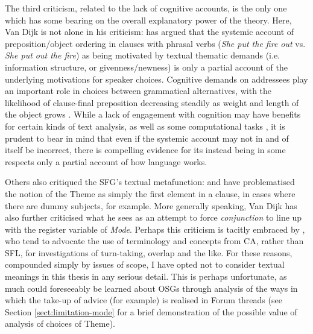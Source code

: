The third criticism, related to the lack of cognitive accounts, is the only one which has some bearing on the overall explanatory power of the theory. Here, Van Dijk is not alone in his criticism: \textcite{rohdenburg_cognitive_1996} has argued that the systemic account of preposition\slash object ordering in clauses with phrasal verbs (\emph{She put the fire out} vs. \emph{She put out the fire}) as being motivated by textual thematic demands (i.e. information structure, or givenness\slash newness) is only a partial account of the underlying motivations for speaker choices. Cognitive demands on addressees play an important role in choices between grammatical alternatives, with the likelihood of clause\hyp{}final preposition decreasing steadily as weight and length of the object grows \cite[c.f.][]{hawkins1992syntactic}. While a lack of engagement with cognition may have benefits for certain kinds of text analysis, as well as some computational tasks \cite{odonnell_[sys-func]_2014}, it is prudent to bear in mind that even if the systemic account may not in and of itself be incorrect, there is compelling evidence for its instead being in some respects only a partial account of how language works.

Others also critiqued the \gls{SFG}'s textual metafunction: \textcite{huddleston_constituency_1988} and \textcite{widdowson_text_2008} have problematised the notion of the \gls{Theme} as simply the first element in a clause, in cases where there are dummy subjects, for example. More generally speaking, Van Dijk has also further criticised what he sees as an attempt to force  \emph{conjunction} to line up with the register variable of \emph{Mode}. Perhaps this criticism is tacitly embraced by \textcite{eggins_analysing_2004}, who tend to advocate the use of terminology and concepts from \gls{CA}, rather than \gls{SFL}, for investigations of turn\hyp{}taking, overlap and the like. For these reasons, compounded simply by issues of scope, I have opted not to consider textual meanings in this thesis in any serious detail. This is perhaps unfortunate, as much could foreseeably be learned about \glspl{OSG} through analysis of the ways in which the take\hyp{}up of advice (for example) is realised in \gls{Forum} \glspl{thread} (see Section \ref{sect:limitation-mode} for a brief demonstration of the possible value of analysis of choices of Theme).





